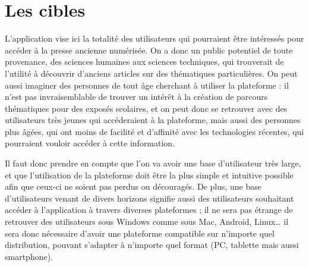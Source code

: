 \section{Les cibles}
\label{sec:cibles}
    L’application vise ici la totalité des utilisateurs qui pourraient être intéressés pour accéder à la presse ancienne numérisée. On a donc un public potentiel de toute provenance, des sciences humaines aux sciences techniques, qui trouverait de l’utilité à découvrir d’anciens articles sur des thématiques particulières. On peut aussi imaginer des personnes de tout âge cherchant à utiliser la plateforme : il n’est pas invraisemblable de trouver un intérêt à la création de parcours thématiques pour des exposés scolaires, et on peut donc se retrouver avec des utilisateurs très jeunes qui accéderaient à la plateforme, mais aussi des personnes plus âgées, qui ont moins de facilité et d’affinité avec les technologies récentes, qui pourraient vouloir accéder à cette information.

    Il faut donc prendre en compte que l’on va avoir une base d’utilisateur très large, et que l’utilisation de la plateforme doit être la plus simple et intuitive possible afin que ceux-ci ne soient pas perdus ou découragés. De plus, une base d’utilisateurs venant de divers horizons signifie aussi des utilisateurs souhaitant accéder à l’application à travers diverses plateformes ; il ne sera pas étrange de retrouver des utilisateurs sous Windows comme sous Mac, Android, Linux… il sera donc nécessaire d’avoir une plateforme compatible sur n’importe quel distribution, pouvant s’adapter à n’importe quel format (PC, tablette mais aussi smartphone).

